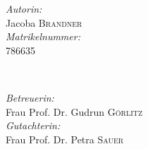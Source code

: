 \begin{titlepage}
\begin{minipage}{0.4\textwidth}
\begin{flushleft} \large
\emph{Autorin:}\\
Jacoba \textsc{Brandner} \\
\emph{Matrikelnummer:}\\
786635
\end{flushleft}
\end{minipage}
~
\begin{minipage}{0.45\textwidth}
\begin{flushright} \large
\emph{Betreuerin:} \\
Frau Prof. Dr. Gudrun \textsc{Görlitz} \\
\emph{Gutachterin:} \\
Frau Prof. Dr. Petra \textsc{Sauer} \\
\end{flushright}
\end{minipage}\\





\vfill %

\end{titlepage}
